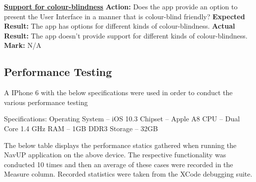 \documentclass[english]{article}
\begin{document}
        \textbf{\underline{Support for colour-blindness}}\newline
		    \textbf{Action:} Does the app provide an option to present the User Interface in a manner that is colour-blind friendly?\newline
            \textbf{Expected Result:} The app has options for different kinds of colour-blindness.\newline
            \textbf{Actual Result:} The app doesn't provide support for different kinds of colour-blindness.\newline
            \textbf{Mark:} N/A\newline
	    
	    \subsection{Performance Testing}\label{subsec:overall-performance}
		A IPhone 6 with the below specifications were used in order to conduct the various performance testing \newline
		
		Specifications: Operating System – iOS 10.3 \newline
		  Chipset – Apple A8 \newline 
		 CPU – Dual Core 1.4 GHz \newline
		 RAM – 1GB DDR3  \newline
		 Storage – 32GB \newline
		 
		 The below table displays the performance statics gathered when running the NavUP application on the above device. The respective functionality was conducted 10 times and then an average of these cases were recorded in the Measure column. Recorded statistics were taken from the XCode debugging suite.
		 
\end{document}
